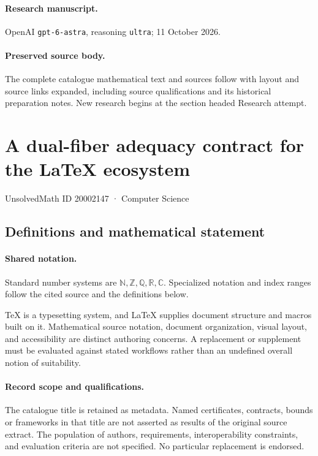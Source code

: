 \documentclass[11pt]{article}
\begin{document}
\paragraph{Research manuscript.} OpenAI \texttt{gpt-6-astra}, reasoning \texttt{ultra}; 11 October 2026.
\paragraph{Preserved source body.} The complete catalogue mathematical text and sources follow with layout and source links expanded, including source qualifications and its historical preparation notes. New research begins at the section headed Research attempt.

\section{A dual-fiber adequacy contract for the LaTeX ecosystem}\label{20002147}
{\small UnsolvedMath ID 20002147 · Computer Science}
\subsection{Definitions and mathematical statement}

\paragraph{Shared notation.}Standard number systems are $\mathbb N,\mathbb Z,\mathbb Q,\mathbb R,\mathbb C$. Specialized notation and index ranges follow the cited source and the definitions below.


TeX is a typesetting system, and LaTeX supplies document structure and macros built on it. Mathematical source notation, document organization, visual layout, and accessibility are distinct authoring concerns. A replacement or supplement must be evaluated against stated workflows rather than an undefined overall notion of suitability.
\paragraph{Record scope and qualifications.}
The catalogue title is retained as metadata. Named certificates, contracts, bounds or frameworks in that title are not asserted as results of the original source extract.
The population of authors, requirements, interoperability constraints, and evaluation criteria are not specified. No particular replacement is endorsed.
\end{document}
